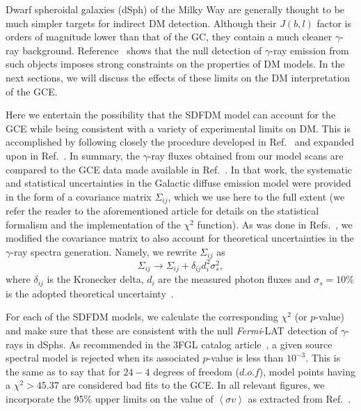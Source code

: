 Dwarf spheroidal galaxies (dSph) of the Milky Way are generally thought to be much simpler targets for indirect DM detection. Although their  $J(b,l)$ factor is orders of magnitude lower than that of the GC, they contain a much cleaner $\gamma$-ray background. Reference~\cite{Ackermann:2015zua} shows that the null detection of $\gamma$-ray emission from such objects imposes strong constraints on the properties of DM models. In the next sections, we will discuss the effects of these limits on the DM interpretation of the GCE. 

Here we entertain the possibility that the SDFDM model can account for the GCE while being consistent with a variety of experimental limits on DM. This is accomplished by following closely the procedure developed in Ref.~\cite{CaloreCholisWeniger2015} and expanded upon in  Ref.~\cite{Caron:2015wda,Bertoneetal}. In summary, the $\gamma$-ray fluxes obtained from our model scans are compared to the GCE data made available in Ref.~\cite{CaloreCholisWeniger2015}. In that work, the systematic and statistical uncertainties in the Galactic diffuse emission model were provided in the form of a covariance matrix $\Sigma_{ij}$, which we use here to the full extent (we refer the reader to the aforementioned article for details on the statistical formalism and the implementation of the $\chi^2$ function). As was done in Refs.~\cite{Caron:2015wda,Bertoneetal}, we modified the covariance matrix to also account for theoretical uncertainties in the $\gamma$-ray spectra generation. Namely, we rewrite $\Sigma_{ij}$ as 
\begin{equation}
\Sigma_{ij} \rightarrow \Sigma_{ij} + \delta_{ij} d^2_{i} \sigma^2_s,
\end{equation}
where $\delta_{ij}$ is the Kronecker delta, $d_i$ are the measured photon fluxes and $\sigma_s=10$\% is the adopted theoretical uncertainty~\cite{Caron:2015wda,Bertoneetal}.


For each of the SDFDM models, we calculate the corresponding $\chi^2$ (or $p$-value) and make sure that these are consistent with the null \textit{Fermi}-LAT detection of $\gamma$-rays in dSphs. As recommended in the 3FGL catalog article~\cite{Acero:2015hja}, a given source spectral model is rejected when its associated $p$-value is less than $10^{-3}$. This is the same as to say that for $24-4$ degrees of freedom ($d.o.f$), model points having a $\chi^2>45.37$ are considered bad fits to the GCE. In all relevant figures, we incorporate the 95\% upper limits on the value of $\left\langle\sigma v \right\rangle$ as extracted from Ref.~\cite{Ackermann:2015zua}.










